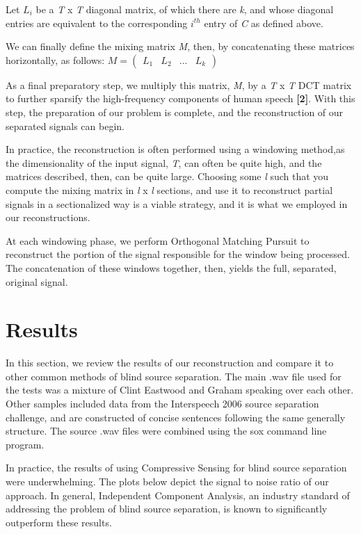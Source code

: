 \documentclass{article}
\begin{document}
Let \textit{$L_{i}$} be a \textit{T} x \textit{T} diagonal matrix, of which there are \textit{k}, and whose diagonal entries are equivalent to the corresponding \textit{$i^{th}$} entry of \textit{C} as defined above.
 
We can finally define the mixing matrix \textit{M}, then, by concatenating these matrices horizontally, as follows: $M = \left( \begin{smallmatrix} L_{1}&L_{2}&...&L_{\textit{k}}  \end{smallmatrix} \right)$

As a final preparatory step, we multiply this matrix, \textit{M}, by a \textit{T} x \textit{T} DCT matrix to further sparsify the high-frequency components of human speech \textbf{[2]}. With this step, the preparation of our problem is complete, and the reconstruction of our separated signals can begin.

In practice, the reconstruction is often performed using a windowing method,as the dimensionality of the input signal, \textit{T}, can often be quite high, and the matrices described, then, can be quite large. Choosing some \textit{l} such that you compute the mixing matrix in \textit{l} x \textit{l} sections, and use it to reconstruct partial signals in a sectionalized way is a viable strategy, and it is what we employed in our reconstructions.

At each windowing phase, we perform Orthogonal Matching Pursuit to reconstruct the portion of the signal responsible for the window being processed. The concatenation of these windows together, then, yields the full, separated, original signal.


\section{Results}
In this section, we review the results of our reconstruction and compare it to other common methods of blind source separation. The main .wav file used for the tests was a mixture of Clint Eastwood and Graham speaking over each other. Other samples included data from the Interspeech 2006 source separation challenge, and are constructed of concise sentences following the same generally structure. The source .wav files were combined using the sox command line program. 

In practice, the results of using Compressive Sensing for blind source separation were underwhelming. The plots below depict the signal to noise ratio of our approach. In general, Independent Component Analysis, an industry standard of addressing the problem of blind source separation, is known to significantly outperform these results.
\end{document}
